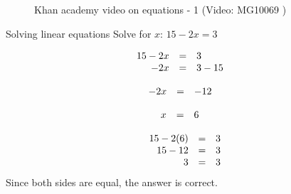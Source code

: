 
\setcounter{subfigure}{0}
\begin{figure}[H] %
\textnormal{Khan academy video on equations - 1}\vspace{.1in} \nopagebreak
\label{m39241*yt-media1}\label{m39241*yt-video1}
 { (Video:  MG10069 )}
\vspace{2pt}
\vspace{.1in}
\end{figure}       

    
\begin{wex}{Solving linear equations }
{
Solve for $x$: $15-2x=3$
}
{

\begin{equation*}
    \begin{array}{cclc}\hfill 15-2x& =& 3\hfill & \\
	    \hfill -2x& =& 3-15\hfill & \hfill 
	    
    \end{array}
\end{equation*}

\begin{equation*}
    \begin{array}{cccc}\hfill -2x& =&-12\hfill & 
	    
    \end{array}
\end{equation*}

\begin{equation*}
    \begin{array}{cccc}\hfill x& =&6\hfill & 
	    
    \end{array}
\end{equation*}

\begin{equation*}
\begin{array}{ccc}\hfill 15 - 2(6)& =& 3\hfill \\
 \hfill 15-12& =& 3\hfill \\
\hfill 3 &=& 3\hfill
\end{array}
\end{equation*}
Since both sides are equal, the answer is correct. 
}
\end{wex}

